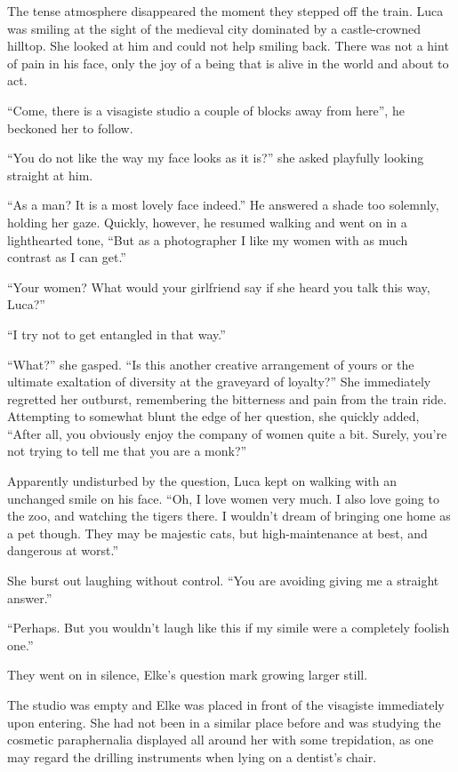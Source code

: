 \sectionline

The tense atmosphere disappeared the moment they stepped off the train. Luca was smiling at the sight of the medieval city dominated by a castle-crowned hilltop. She looked at him and could not help smiling back. There was not a hint of pain in his face, only the joy of a being that is alive in the world and about to act.

``Come, there is a visagiste studio a couple of blocks away from here'', he beckoned her to follow.

``You do not like the way my face looks as it is?'' she asked playfully looking straight at him.

``As a man? It is a most lovely face indeed.'' He answered a shade too solemnly, holding her gaze. Quickly, however, he resumed walking and went on in a lighthearted tone, ``But as a photographer I like my women with as much contrast as I can get.''

``Your women? What would your girlfriend say if she heard you talk this way, Luca?''

``I try not to get entangled in that way.''

``What?'' she gasped. ``Is this another creative arrangement of yours or the ultimate exaltation of diversity at the graveyard of loyalty?'' She immediately regretted her outburst, remembering the bitterness and pain from the train ride. Attempting to somewhat blunt the edge of her question, she quickly added, ``After all, you obviously enjoy the company of women quite a bit. Surely, you're not trying to tell me that you are a monk?''

Apparently undisturbed by the question, Luca kept on walking with an unchanged smile on his face. ``Oh, I love women very much. I also love going to the zoo, and watching the tigers there. I wouldn't dream of bringing one home as a pet though. They may be majestic cats, but high-maintenance at best, and dangerous at worst.''

She burst out laughing without control. ``You are avoiding giving me a straight answer.''

``Perhaps. But you wouldn't laugh like this if my simile were a completely foolish one.''

They went on in silence, Elke's question mark growing larger still.

\sectionline

The studio was empty and Elke was placed in front of the visagiste immediately upon entering. She had not been in a similar place before and was studying the cosmetic paraphernalia displayed all around her with some trepidation, as one may regard the drilling instruments when lying on a dentist's chair.


